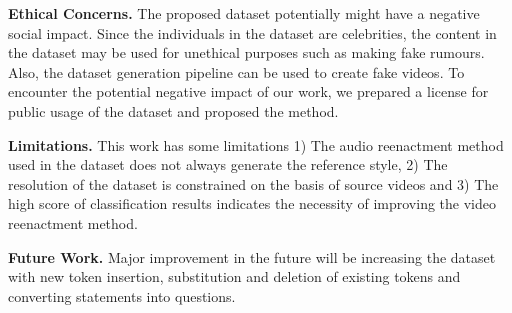 \documentclass[conference, a4paper]{IEEEtran}
\begin{document}
\noindent \textbf{Ethical Concerns.} 
The proposed dataset potentially might have a negative social impact. Since the individuals in the dataset are celebrities, the content in the dataset may be used for unethical purposes such as making fake rumours. Also, the dataset generation pipeline can be used to create fake videos. To encounter the potential negative impact of our work, we prepared a license for public usage of the dataset and proposed the method.

\noindent \textbf{Limitations.} This work has some limitations 1) The audio reenactment method used in the dataset does not always generate the reference style, 2) The resolution of the dataset is constrained on the basis of source videos and 3) The high score of classification results indicates the necessity of improving the video reenactment method. 



\noindent \textbf{Future Work.} Major improvement in the future will be increasing the dataset with new token insertion, substitution and deletion of existing tokens and converting statements into questions.






















\end{document}
